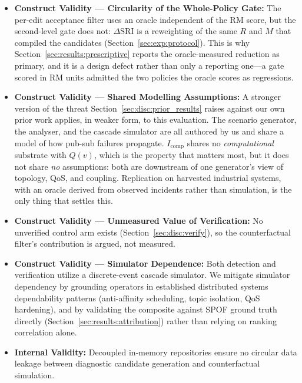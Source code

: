 \begin{itemize}
    \item \textbf{Construct Validity --- Circularity of the Whole-Policy Gate:} The per-edit acceptance filter uses an oracle independent of the RM score, but the second-level gate does not: $\Delta\mathrm{SRI}$ is a reweighting of the same $R$ and $M$ that compiled the candidates (Section~\ref{sec:exp:protocol}). This is why Section~\ref{sec:results:prescriptive} reports the oracle-measured reduction as primary, and it is a design defect rather than only a reporting one---a gate scored in RM units admitted the two policies the oracle scores as regressions.
    \item \textbf{Construct Validity --- Shared Modelling Assumptions:} A stronger version of the threat Section~\ref{sec:disc:prior_results} raises against our own prior work applies, in weaker form, to this evaluation. The scenario generator, the analyser, and the cascade simulator are all authored by us and share a model of how pub-sub failures propagate. $I_{\text{comp}}$ shares no \emph{computational} substrate with $Q(v)$, which is the property that matters most, but it does not share \emph{no} assumptions: both are downstream of one generator's view of topology, QoS, and coupling. Replication on harvested industrial systems, with an oracle derived from observed incidents rather than simulation, is the only thing that settles this.
    \item \textbf{Construct Validity --- Unmeasured Value of Verification:} No unverified control arm exists (Section~\ref{sec:disc:verify}), so the counterfactual filter's contribution is argued, not measured.
    \item \textbf{Construct Validity --- Simulator Dependence:} Both detection and verification utilize a discrete-event cascade simulator. We mitigate simulator dependency by grounding operators in established distributed systems dependability patterns (anti-affinity scheduling, topic isolation, QoS hardening), and by validating the composite against SPOF ground truth directly (Section~\ref{sec:results:attribution}) rather than relying on ranking correlation alone.
    \item \textbf{Internal Validity:} Decoupled in-memory repositories ensure no circular data leakage between diagnostic candidate generation and counterfactual simulation.

\end{itemize}
